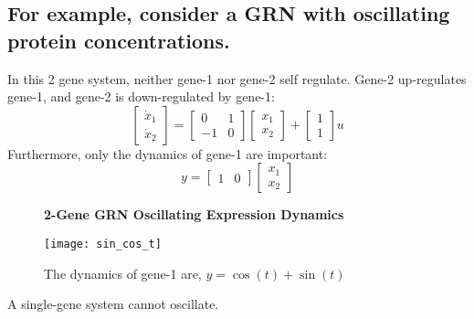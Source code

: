 \documentclass{seminar}
\begin{document}
  \begin{slide}
    \section*{For example, consider a GRN with oscillating protein concentrations.}
    In this 2 gene system, neither gene-1 nor gene-2 self regulate. Gene-2 up-regulates gene-1, and gene-2 is down-regulated by gene-1:
      \begin{equation*}
        \begin{bmatrix} \dot{x}_{1} \\ \dot{x}_{2} \end{bmatrix} = \begin{bmatrix} 0 & 1 \\ -1 & 0 \end{bmatrix} \begin{bmatrix} x_{1} \\ x_{2} \end{bmatrix} + \begin{bmatrix} 1 \\ 1 \end{bmatrix} u
      \end{equation*}
      Furthermore, only the dynamics of gene-1 are important:
      \begin{equation*}
        y = \begin{bmatrix} 1 & 0 \end{bmatrix} \begin{bmatrix} x_{1} \\ x_{2} \end{bmatrix}
      \end{equation*}
  \end{slide}

  \begin{slide}
    \begin{figure}{\bf{2-Gene GRN Oscillating Expression Dynamics}}
      \centering
      \caption{The dynamics of gene-1 are, $y = \cos(t) + \sin(t)$}
      \texttt{[image: sin\_cos\_t]}
    \end{figure}
    A single-gene system cannot oscillate. 
  \end{slide}
\end{document}
